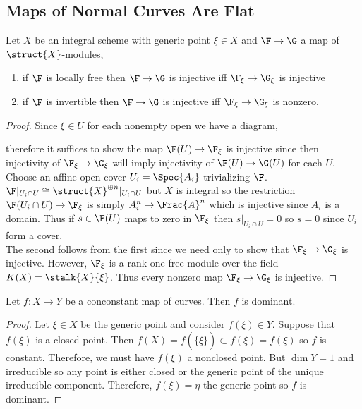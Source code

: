 \documentclass[12pt]{article}
\begin{document}
\subsection{Maps of Normal Curves Are Flat}

\begin{lemma} \label{generic_injection}
Let $X$ be an integral scheme with generic point $\xi \in X$ and $\F \to \G$ a map of $\struct{X}$-modules,
\begin{enumerate}
\item if $\F$ is locally free then $\F \to \G$ is injective iff $\F_\xi \to \G_\xi$ is injective
\item if $\F$ is invertible then $\F \to \G$ is injective iff $\F_\xi \to \G_\xi$ is nonzero.
\end{enumerate}
\end{lemma}

\begin{proof}
Since $\xi \in U$ for each nonempty open we have a diagram,
\begin{center}
\end{center}
therefore it suffices to show the map $\F(U) \to \F_\xi$ is injective since then injectivity of $\F_\xi \to \G_\xi$ will imply injectivity of $\F(U) \to \G(U)$ for each $U$. Choose an affine open cover $U_i = \Spec{A_i}$ trivializing $\F$. $\F|_{U_i \cap U} \cong \struct{X}^{\oplus n}|_{U_i \cap U}$ but $X$ is integral so the restriction $\F(U_i \cap U) \to \F_\xi$ is simply $A_i^n \to \Frac{A}^n$ which is injective since $A_i$ is a domain. Thus if $s \in \F(U)$ maps to zero in $\F_\xi$ then $s|_{U_i \cap U} = 0$ so $s = 0$ since $U_i$ form a cover.
\bigskip\\
The second follows from the first since we need only to show that $\F_\xi \to \G_\xi$ is injective. However, $\F_\xi$ is a rank-one free module over the field $K(X) = \stalk{X}{\xi}$. Thus every nonzero map $\F_\xi \to \G_\xi$ is injective.
\end{proof}

\begin{lemma}
Let $f : X \to Y$ be a conconstant map of curves. Then $f$ is dominant.
\end{lemma}

\begin{proof}
Let $\xi \in X$ be the generic point and consider $f(\xi) \in Y$. Suppose that $f(\xi)$ is a closed point. Then $f(X) = f(\overline{\{ \xi \}}) \subset \overline{f(\xi)} = f(\xi)$ so $f$ is constant. Therefore, we must have $f(\xi)$ a nonclosed point. But $\dim{Y} = 1$ and irreducible so any point is either closed or the generic point of the unique irreducible component. Therefore, $f(\xi) = \eta$ the generic point so $f$ is dominant.
\end{proof}
\end{document}
